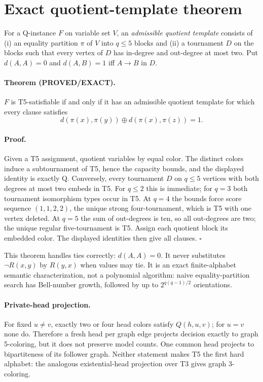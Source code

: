 \documentclass[11pt]{article}
\begin{document}
\section{Exact quotient-template theorem}
For a Q-instance $F$ on variable set $V$, an \emph{admissible quotient template} consists of (i) an equality partition $\pi$ of $V$ into $q\le5$ blocks and (ii) a tournament $D$ on the blocks such that every vertex of $D$ has in-degree and out-degree at most two.  Put $d(A,A)=0$ and $d(A,B)=1$ iff $A\to B$ in $D$.

\paragraph{Theorem (PROVED/EXACT).}
$F$ is T5-satisfiable if and only if it has an admissible quotient template for which every clause satisfies
\[
d(\pi(x),\pi(y))\oplus d(\pi(x),\pi(z))=1.
\]

\paragraph{Proof.}
Given a T5 assignment, quotient variables by equal color.  The distinct colors induce a subtournament of T5, hence the capacity bounds, and the displayed identity is exactly Q.  Conversely, every tournament $D$ on $q\le5$ vertices with both degrees at most two embeds in T5.  For $q\le2$ this is immediate; for $q=3$ both tournament isomorphism types occur in T5.  At $q=4$ the bounds force score sequence $(1,1,2,2)$, the unique strong four-tournament, which is T5 with one vertex deleted.  At $q=5$ the sum of out-degrees is ten, so all out-degrees are two; the unique regular five-tournament is T5.  Assign each quotient block its embedded color.  The displayed identities then give all clauses. \hfill$\square$

This theorem handles ties correctly: $d(A,A)=0$.  It never substitutes $\neg R(x,y)$ by $R(y,x)$ when values may tie.  It is an exact finite-alphabet semantic characterization, not a polynomial algorithm: naive equality-partition search has Bell-number growth, followed by up to $2^{q(q-1)/2}$ orientations.

\paragraph{Private-head projection.}
For fixed $u\ne v$, exactly two or four head colors satisfy $Q(h,u,v)$; for $u=v$ none do.  Therefore a fresh head per graph edge projects decision exactly to graph 5-coloring, but it does not preserve model counts.  One common head projects to bipartiteness of its follower graph.  Neither statement makes T5 the first hard alphabet: the analogous existential-head projection over T3 gives graph 3-coloring.
\end{document}
